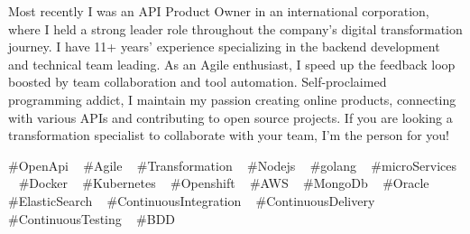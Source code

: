 

\begin{cvparagraph}

Most recently I was an API Product Owner in an international corporation, where I held a strong leader role throughout the company's digital transformation journey. I have 11+ years’ experience specializing in the backend development and technical team leading.
As an Agile enthusiast, I speed up the feedback loop boosted by team collaboration and tool automation.
Self-proclaimed programming addict, I maintain my passion creating online products, connecting with various APIs and contributing to open source projects. If you are looking a transformation specialist to collaborate with your team, I'm the person for you!

\end{cvparagraph}
\begin{cvtechnologies}
 \#OpenApi ~
 \#Agile ~
 \#Transformation ~
 \#Nodejs ~
 \#golang ~
 \#microServices ~
 \#Docker ~
 \#Kubernetes ~
 \#Openshift ~
 \#AWS ~
 \#MongoDb ~
 \#Oracle ~
 \#ElasticSearch ~
 \#ContinuousIntegration ~
 \#ContinuousDelivery ~
 \#ContinuousTesting ~
 \#BDD 
\end{cvtechnologies}
